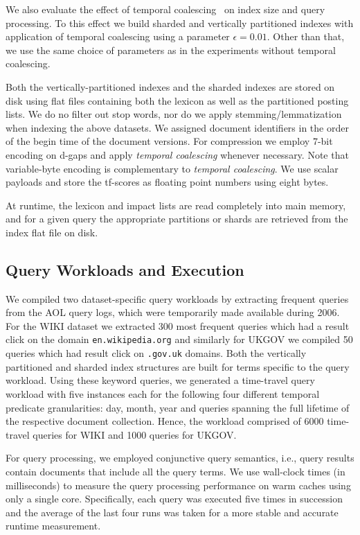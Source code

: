 We also evaluate the effect of temporal coalescing~\cite{kberberi:sigir2007} on index size and query
processing. To this effect we build sharded and vertically partitioned indexes with application of temporal coalescing using a parameter
$\epsilon=0.01$. Other than that, we use the same choice of parameters
as in the experiments without temporal coalescing.


Both the vertically-partitioned indexes and the sharded indexes are stored on disk using flat files containing both the lexicon as well as the partitioned posting lists. We do no filter out stop words, nor do we apply stemming/lemmatization when indexing the above datasets. We assigned document identifiers in the order of the begin time of the document versions. For compression we employ 7-bit encoding on d-gaps and apply \emph{temporal coalescing} whenever necessary. Note that variable-byte encoding is complementary to \emph{temporal coalescing}. We use scalar payloads and store the tf-scores as floating point numbers using eight bytes. 

At runtime, the lexicon and impact lists are read
completely into main memory, and for a given query the appropriate
partitions or shards are retrieved from the index flat file on disk.

\subsection{Query Workloads and Execution}
\label{sec:sharding_workloads}
We compiled two dataset-specific query workloads by extracting
frequent queries from the AOL query logs, which were temporarily made
available during 2006. For the WIKI dataset we extracted 300 most
frequent queries which had a result click on the domain
\texttt{en.wikipedia.org} and similarly for UKGOV we compiled 50
queries which had result click on \texttt{.gov.uk} domains. Both the
vertically partitioned and sharded index structures are built for terms specific to
the query workload. Using these keyword queries, we generated a
time-travel query workload with five instances each for the following four
different temporal predicate granularities: day, month, year and
queries spanning the full lifetime of the respective document
collection. Hence, the workload comprised of 6000 time-travel queries for WIKI and 1000 queries for UKGOV.

For query processing, we employed conjunctive query semantics, i.e.,
query results contain documents that include all the query terms. We
use wall-clock times (in milliseconds) to measure the query processing
performance on warm caches using only a
single core. Specifically, each query was executed five times in
succession and the average of the last four runs was taken for a more
stable and accurate runtime measurement.

